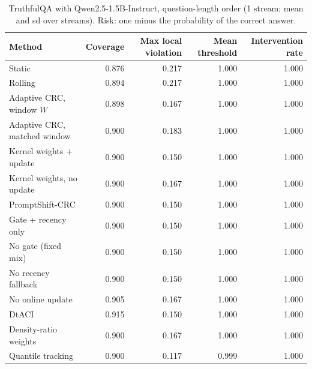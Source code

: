 \begin{table}[H]
\centering
\small
\caption{TruthfulQA with Qwen2.5-1.5B-Instruct, question-length order (1 stream; mean and sd over streams). Risk: one minus the probability of the correct answer.}
\label{tab:truthfulqa_length_ascending}
\begin{tabular}{lrrrr}
\toprule
Method & Coverage & Max local violation & Mean threshold & Intervention rate \\
\midrule
Static & 0.876 & 0.217 & 1.000 & 1.000 \\
Rolling & 0.894 & 0.217 & 1.000 & 1.000 \\
Adaptive CRC, window $W$ & 0.898 & 0.167 & 1.000 & 1.000 \\
Adaptive CRC, matched window & 0.900 & 0.183 & 1.000 & 1.000 \\
Kernel weights + update & 0.900 & 0.150 & 1.000 & 1.000 \\
Kernel weights, no update & 0.900 & 0.167 & 1.000 & 1.000 \\
PromptShift-CRC & 0.900 & 0.150 & 1.000 & 1.000 \\
Gate + recency only & 0.900 & 0.150 & 1.000 & 1.000 \\
No gate (fixed mix) & 0.900 & 0.150 & 1.000 & 1.000 \\
No recency fallback & 0.900 & 0.150 & 1.000 & 1.000 \\
No online update & 0.905 & 0.167 & 1.000 & 1.000 \\
DtACI & 0.915 & 0.150 & 1.000 & 1.000 \\
Density-ratio weights & 0.900 & 0.167 & 1.000 & 1.000 \\
Quantile tracking & 0.900 & 0.117 & 0.999 & 1.000 \\
\bottomrule
\end{tabular}
\end{table}

\begin{table}[H]
\centering
\small
\caption{Frontier gap on TRUTHFULQA streams (post-shift violation minus the Adaptive-CRC window-sweep curve at the same mean threshold; mean over orderings with standard error). Negative is better than Adaptive CRC. Where a method's mean threshold lies outside the range of the window sweep the curve is clipped to its nearest end; the last column repeats the PromptShift-CRC gap over the orderings whose threshold lies inside the range.}
\label{tab:frontier_truthfulqa}
\end{table}

